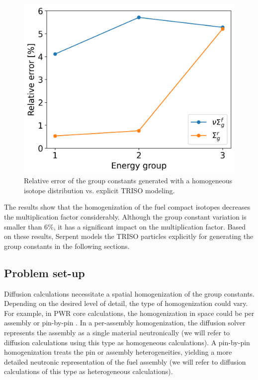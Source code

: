 \begin{figure}[htbp!]
	\centering
	\includegraphics[width=0.43\linewidth]{figures-neutronics/param-comparison}
	\hfill
	\caption{Relative error of the group constants generated with a homogeneous isotope distribution vs. explicit TRISO modeling.}
	\label{fig:param-comparison}
\end{figure}

The results show that the homogenization of the fuel compact isotopes decreases the multiplication factor considerably.
Although the group constant variation is smaller than 6\%, it has a significant impact on the multiplication factor.
Based on these results, Serpent models the TRISO particles explicitly for generating the group constants in the following sections.

\subsection{Problem set-up}
\label{sec:setup}

Diffusion calculations necessitate a spatial homogenization of the group constants.
Depending on the desired level of detail, the type of homogenization could vary.
For example, in PWR core calculations, the homogenization in space could be per assembly or pin-by-pin \cite{krebs_calculational_1990}.
In a per-assembly homogenization, the diffusion solver represents the assembly as a single material neutronically (we will refer to diffusion calculations using this type as homogeneous calculations).
A pin-by-pin homogenization treats the pin or assembly heterogeneities, yielding a more detailed neutronic representation of the fuel assembly (we will refer to diffusion calculations of this type as heterogeneous calculations).


